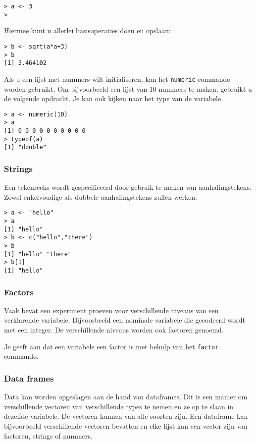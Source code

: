 \begin{lstlisting}
> a <- 3
>
\end{lstlisting}

Hiermee kunt u allerlei basisoperaties doen en opslaan:

\begin{lstlisting}
> b <- sqrt(a*a+3)
> b
[1] 3.464102
\end{lstlisting}

Als u een lijst met nummers wilt initialiseren, kan het \texttt{numeric} commando worden gebruikt. Om bijvoorbeeld een lijst van 10 nummers te maken, gebruikt u de volgende opdracht. Je kan ook kijken naar het type van de variabele.

\begin{lstlisting}
> a <- numeric(10)
> a
[1] 0 0 0 0 0 0 0 0 0 0
> typeof(a)
[1] "double"
\end{lstlisting}

\subsubsection{Strings}

Een tekenreeks wordt gespecificeerd door gebruik te maken van aanhalingstekens. Zowel enkelvoudige als dubbele aanhalingstekens zullen werken:

\begin{lstlisting}
> a <- "hello"
> a
[1] "hello"
> b <- c("hello","there")
> b
[1] "hello" "there"
> b[1]
[1] "hello"
\end{lstlisting}

\subsubsection{Factors}

Vaak bevat een experiment proeven voor verschillende niveaus van een  verklarende variabele. Bijvoorbeeld een nominale variabele die gecodeerd wordt met een integer. De verschillende niveaus worden ook factoren genoemd.

Je geeft aan dat een variabele een factor is met behulp van het \texttt{factor} commando. 

\subsubsection{Data frames}

Data kan worden opgeslagen aan de hand van dataframes. Dit is een manier om verschillende vectoren van verschillende types te nemen en ze op te slaan in dezelfde variabele. De vectoren kunnen van alle soorten zijn. Een dataframe kan bijvoorbeeld verschillende vectoren bevatten en elke lijst kan een vector zijn van factoren, strings of nummers.

